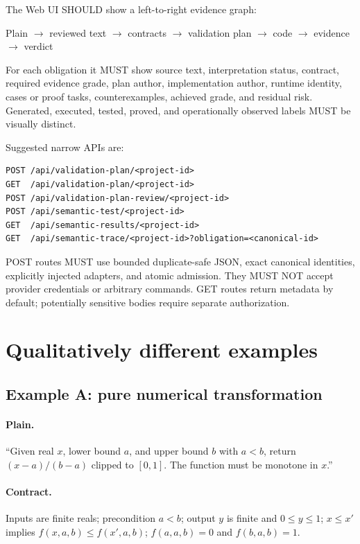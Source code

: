\documentclass[10pt]{article}
\begin{document}
The Web UI SHOULD show a left-to-right evidence graph:

\begin{center}
Plain $\rightarrow$ reviewed text $\rightarrow$ contracts $\rightarrow$
validation plan $\rightarrow$ code $\rightarrow$ evidence $\rightarrow$ verdict
\end{center}

For each obligation it MUST show source text, interpretation status, contract,
required evidence grade, plan author, implementation author, runtime identity,
cases or proof tasks, counterexamples, achieved grade, and residual risk.
Generated, executed, tested, proved, and operationally observed labels MUST be
visually distinct.

Suggested narrow APIs are:

\begin{lstlisting}
POST /api/validation-plan/<project-id>
GET  /api/validation-plan/<project-id>
POST /api/validation-plan-review/<project-id>
POST /api/semantic-test/<project-id>
GET  /api/semantic-results/<project-id>
GET  /api/semantic-trace/<project-id>?obligation=<canonical-id>
\end{lstlisting}

POST routes MUST use bounded duplicate-safe JSON, exact canonical identities,
explicitly injected adapters, and atomic admission.  They MUST NOT accept
provider credentials or arbitrary commands.  GET routes return metadata by
default; potentially sensitive bodies require separate authorization.

\section{Qualitatively different examples}

\subsection{Example A: pure numerical transformation}

\paragraph{Plain.}
``Given real $x$, lower bound $a$, and upper bound $b$ with $a<b$, return
$(x-a)/(b-a)$ clipped to $[0,1]$.  The function must be monotone in $x$.''

\paragraph{Contract.}
Inputs are finite reals; precondition $a<b$; output $y$ is finite and
$0\le y\le1$; $x\le x'$ implies $f(x,a,b)\le f(x',a,b)$; $f(a,a,b)=0$ and
$f(b,a,b)=1$.
\end{document}
